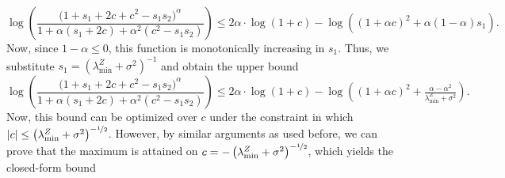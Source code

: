 \documentclass[11pt]{article}
\theoremstyle{definition}
\theoremstyle{plain}
\newcommand{\abs}[1]{\left| #1 \right|}
\begin{document}
\begin{equation}
    \log\left(\frac{\big(1+ s_1 + 2c + c^2 - s_1 s_2\big)^{\alpha}}{1 + \alpha\left( s_1 + 2c\right) + \alpha^2 \left(c^2 - s_1 s_2\right)}\right) \leq 2\alpha \cdot \log(1+c) -\log\left(\left(1 + \alpha c\right)^2 + \alpha(1-\alpha)s_1\right). 
\end{equation}
Now, since $1 - \alpha \leq 0$, this function is monotonically increasing in $s_1$. Thus, we substitute $s_1 = \left(\lambda^{Z}_{\min} + \sigma^2\right)^{-1}$ and obtain the upper bound 
\begin{equation}
    \log\left(\frac{\big(1+ s_1 + 2c + c^2 - s_1 s_2\big)^{\alpha}}{1 + \alpha\left( s_1 + 2c\right) + \alpha^2 \left(c^2 - s_1 s_2\right)}\right)\leq 2\alpha \cdot \log(1+c) - \log\left(\left(1 + \alpha c\right)^2 + \tfrac{\alpha - \alpha^2}{\lambda^{Z}_{\min} + \sigma^2}\right). 
\end{equation}
Now, this bound can be optimized over $c$ under the constraint in which $\abs{c} \leq \left(\lambda^{Z}_{\min} + \sigma^2\right)^{-\nicefrac{1}{2}}$. However, by similar arguments as used before, we can prove that the maximum is attained on $c = -\left(\lambda^{Z}_{\min} + \sigma^2\right)^{-\nicefrac{1}{2}}$, which yields the closed-form bound  
\end{document}

